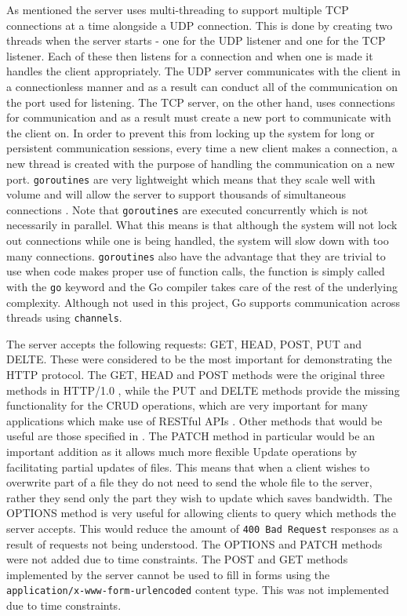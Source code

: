 \documentclass[10pt,twocolumn]{witseiepaper}
\begin{document}
	As mentioned the server uses multi-threading to support multiple TCP connections at a time alongside a UDP connection. This is done by creating two threads when the server starts - one for the UDP listener and one for the TCP listener. Each of these then listens for a connection and when one is made it handles the client appropriately. The UDP server communicates with the client in a connectionless manner and as a result can conduct all of the communication on the port used for listening. The TCP server, on the other hand, uses connections for communication and as a result must create a new port to communicate with the client on. In order to prevent this from locking up the system for long or persistent communication sessions, every time a new client makes a connection, a new thread is created with the purpose of handling the communication on a new port. \texttt{goroutines} are very lightweight which means that they scale well with volume and will allow the server to support thousands of simultaneous connections \cite{doxsey}. Note that \texttt{goroutines} are executed concurrently which is not necessarily in parallel. What this means is that although the system will not lock out connections while one is being handled, the system will slow down with too many connections. \texttt{goroutines} also have the advantage that they are trivial to use when code makes proper use of function calls, the function is simply called with the \texttt{go} keyword and the Go compiler takes care of the rest of the underlying complexity. Although not used in this project, Go supports communication across threads using \texttt{channels}.

	The server accepts the following requests: GET, HEAD, POST, PUT and DELTE. These were considered to be the most important for demonstrating the HTTP protocol. The GET, HEAD and POST methods were the original three methods in HTTP/1.0 \cite{rfc1945}, while the PUT and DELTE methods provide the missing functionality for the CRUD operations, which are very important for many applications which make use of RESTful APIs \cite{guinard}. Other methods that would be useful are those specified in . The PATCH method in particular would be an important addition as it allows much more flexible Update operations by facilitating partial updates of files. This means that when a client wishes to overwrite part of a file they do not need to send the whole file to the server, rather they send only the part they wish to update which saves bandwidth. The OPTIONS method is very useful for allowing clients to query which methods the server accepts. This would reduce the amount of \texttt{400 Bad Request} responses as a result of requests not being understood. The OPTIONS and PATCH methods were not added due to time constraints. The POST and GET methods implemented by the server cannot be used to fill in forms using the \texttt{application/x-www-form-urlencoded} content type. This was not implemented due to time constraints.
\end{document}
